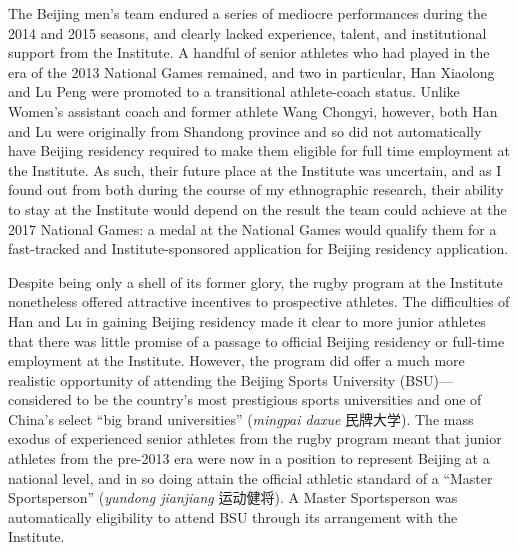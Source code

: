 \begin{CJK}{UTF8}{gbsn}
The Beijing men's team endured a series of mediocre performances during the 2014 and 2015 seasons, and clearly lacked experience, talent, and institutional support from the Institute.  A handful of senior athletes who had played in the era of the 2013 National Games remained, and two in particular, Han Xiaolong and Lu Peng were promoted to a transitional athlete-coach status. Unlike Women's assistant coach and former athlete Wang Chongyi, however, both Han and Lu were originally from Shandong province and so did not automatically have Beijing residency required to make them eligible for full time employment at the Institute.  As such, their future place at the Institute was uncertain, and as I found out from both during the course of my ethnographic research, their ability to stay at the Institute would depend on the result the team could achieve at the 2017 National Games: a medal at the National Games would qualify them for a fast-tracked and Institute-sponsored application for Beijing residency application.

Despite being only a shell of its former glory, the rugby program at the Institute nonetheless offered attractive incentives to prospective athletes.  The difficulties of Han and Lu in gaining Beijing residency made it clear to more junior athletes that there was little promise of a passage to official Beijing residency or full-time employment at the Institute.  However, the program did offer a much more realistic opportunity of attending the Beijing Sports University (BSU)---considered to be the country's most prestigious sports universities and one of China's select ``big brand universities'' (\textit{mingpai daxue} 民牌大学).  The mass exodus of experienced senior athletes from the rugby program meant that junior athletes from the pre-2013 era were now in a position to represent Beijing at a national level, and in so doing attain the official athletic standard of a ``Master Sportsperson'' (\textit{yundong jianjiang} 运动健将).  A Master Sportsperson was automatically eligibility to attend BSU through its arrangement with the Institute.


\end{CJK}
